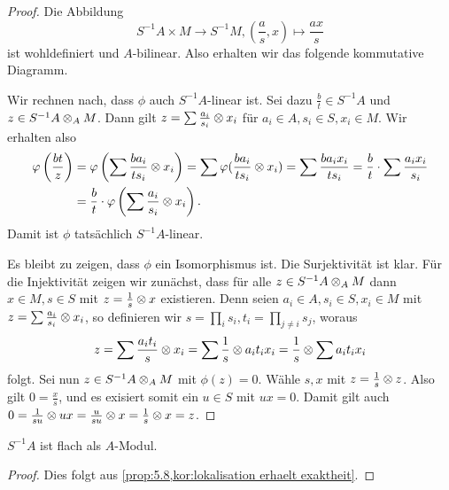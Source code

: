 \documentclass[12pt,a4paper]{scrartcl}
\theoremstyle{cplain}
\theoremstyle{cdef}
\begin{document}
\begin{proof}
	Die Abbildung \[S^{-1}A\times M\to S^{-1}M, \left(\frac as,x\right)\mapsto \frac{ax}s\]
	ist wohldefiniert und $A$-bilinear. Also erhalten wir das folgende kommutative Diagramm.
	\begin{center}
	\end{center}
	Wir rechnen nach, dass $\phi$ auch  $S^{-1}A$-linear ist. Sei dazu $\frac bt \in S^{-1}A$ und $z\in S^{-1}A\otimes_A M$. Dann gilt $z = \sum \frac {a_i}{s_i}\otimes x_i$ für $a_i\in A, s_i\in S, x_i\in M$. Wir erhalten also
	\begin{align*}
		\varphi\left(\frac{bt} z\right) &=\varphi\left(\sum\frac{ba_i}{ts_i}\otimes x_i \right) = \sum\varphi(\frac{ba_i}{ts_i}\otimes x_i) = \sum \frac{ba_ix_i}{ts_i} = \frac{b}{t} \cdot \sum \frac{a_ix_i}{s_i} \\
		&= \frac bt \cdot \varphi\left(\sum\frac{a_i}{s_i}\otimes x_i\right).
	\end{align*}
	Damit ist $\phi$ tatsächlich $S^{-1}A$-linear.
	
	Es bleibt zu zeigen, dass $\phi$ ein Isomorphismus ist. Die Surjektivität ist klar. Für die Injektivität zeigen wir zunächst, dass für alle $z\in S^{-1}A\otimes_AM$ dann $x\in M, s\in S$ mit $z = \frac 1s\otimes x$ existieren. Denn seien $a_i\in A, s_i\in S, x_i\in M$ mit $z = \sum\frac{a_i}{s_i}\otimes x_i$, so definieren wir $s = \prod_i s_i, t_i = \prod_{j \neq i} s_j$, woraus \[z = \sum \frac{a_it_i}{s}\otimes x_i = \sum \frac 1s \otimes a_it_ix_i = \frac{1}{s}\otimes\sum a_it_ix_i\]
	folgt. Sei nun $z\in S^{-1}A\otimes_AM$ mit $\phi(z) = 0$. Wähle $s,x$ mit $z = \frac 1s\otimes z$. Also gilt $0 = \frac xs$, und es exisiert somit ein $u\in S$ mit $ux = 0$. Damit gilt auch $0 = \frac 1{su}\otimes ux = \frac{u}{su}\otimes x = \frac{1}{s}\otimes x = z$.
\end{proof}
\begin{kor}
	$S^{-1}A$ ist flach als $A$-Modul.
\end{kor}
\begin{proof}
	Dies folgt aus \cref{prop:5.8,kor:lokalisation erhaelt exaktheit}.
\end{proof}
\end{document}
